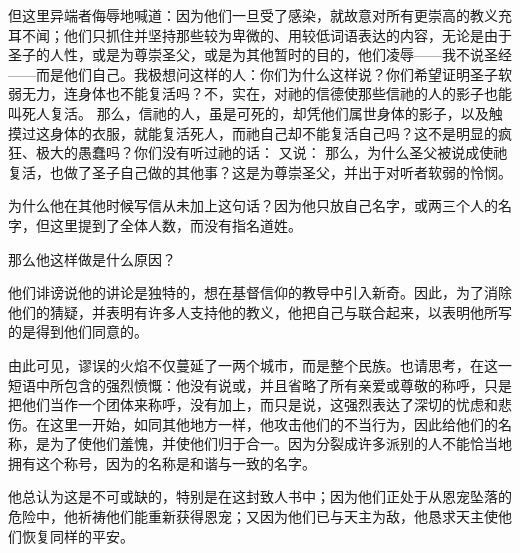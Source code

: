 但这里异端者侮辱地喊道：因为他们一旦受了感染，就故意对所有更崇高的教义充耳不闻；他们只抓住并坚持那些较为卑微的、用较低词语表达的内容，无论是由于圣子的人性，或是为尊崇圣父，或是为其他暂时的目的，他们凌辱——我不说圣经——而是他们自己。我极想问这样的人：你们为什么这样说？你们希望证明圣子软弱无力，连身体也不能复活吗？不，实在，对祂的信德使那些信祂的人的影子也能叫死人复活。 那么，信祂的人，虽是可死的，却凭他们属世身体的影子，以及触摸过这身体的衣服，就能复活死人，而祂自己却不能复活自己吗？这不是明显的疯狂、极大的愚蠢吗？你们没有听过祂的话： 又说： 那么，为什么圣父被说成使祂复活，也做了圣子自己做的其他事？这是为尊崇圣父，并出于对听者软弱的怜悯。\par

\par

为什么他在其他时候写信从未加上这句话？因为他只放自己名字，或两三个人的名字，但这里提到了全体人数，而没有指名道姓。\par

那么他这样做是什么原因？\par

他们诽谤说他的讲论是独特的，想在基督信仰的教导中引入新奇。因此，为了消除他们的猜疑，并表明有许多人支持他的教义，他把自己与联合起来，以表明他所写的是得到他们同意的。\par

\par

由此可见，谬误的火焰不仅蔓延了一两个城市，而是整个民族。也请思考，在这一短语中所包含的强烈愤慨：他没有说或，并且省略了所有亲爱或尊敬的称呼，只是把他们当作一个团体来称呼，没有加上，而只是说，这强烈表达了深切的忧虑和悲伤。在这里一开始，如同其他地方一样，他攻击他们的不当行为，因此给他们的名称，是为了使他们羞愧，并使他们归于合一。因为分裂成许多派别的人不能恰当地拥有这个称号，因为的名称是和谐与一致的名字。\par

\par

他总认为这是不可或缺的，特别是在这封致人书中；因为他们正处于从恩宠坠落的危险中，他祈祷他们能重新获得恩宠；又因为他们已与天主为敌，他恳求天主使他们恢复同样的平安。\par

